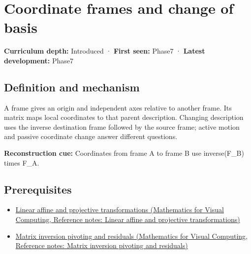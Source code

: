 \hypertarget{appendix-1bae9457dbc3}{}\label{referencestart:appendix-1bae9457dbc3}
\section{Coordinate frames and change of basis}\label{appendix-1bae9457dbc3-coordinate-frames-and-change-of-basis}

\hypertarget{appendix-1bae9457dbc3-coordinate-frames-and-change-of-basis}{}

\textbf{Curriculum depth:} Introduced · \textbf{First seen:} Phase7 · \textbf{Latest development:} Phase7

\begin{allmightroledefinition}

\subsection{Definition and mechanism}\label{appendix-1bae9457dbc3-definition-and-mechanism}

\hypertarget{appendix-1bae9457dbc3-definition-and-mechanism}{}

A frame gives an origin and independent axes relative to another frame. Its matrix maps local coordinates to that parent description. Changing description uses the inverse destination frame followed by the source frame; active motion and passive coordinate change answer different questions.

\end{allmightroledefinition}

\textbf{Reconstruction cue:} Coordinates from frame A to frame B use inverse(F\_B) times F\_A.

\subsection{Prerequisites}\label{appendix-1bae9457dbc3-prerequisites}

\hypertarget{appendix-1bae9457dbc3-prerequisites}{}

\begin{itemize}
\tightlist
\item
  \href{../02-Mathematics-for-Visual-Computing/main.pdf\#nameddest=appendix-0bf0ca73f735}{Linear affine and projective transformations (Mathematics for Visual Computing, Reference notes: Linear affine and projective transformations)}
\item
  \href{../02-Mathematics-for-Visual-Computing/main.pdf\#nameddest=appendix-48d2e66378ab}{Matrix inversion pivoting and residuals (Mathematics for Visual Computing, Reference notes: Matrix inversion pivoting and residuals)}
\end{itemize}

